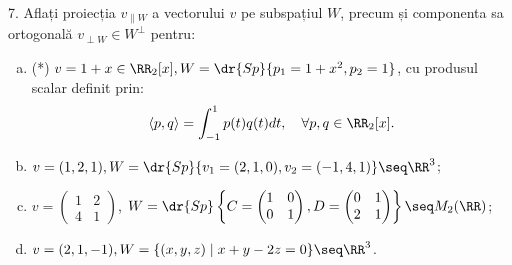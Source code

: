 7. Aflați proiecția $ v_{\parallel W} $ a vectorului $ v $ pe
subspațiul $ W $, precum și componenta sa ortogonală $ v_{\perp W} \in W^\perp $ pentru:
\begin{enumerate}[(a)]
\item (*) $ v = 1 + x \in \RR_2[x], W = \dr{Sp}\{ p_1 = 1 + x^2, p_2 = 1 \} $, cu
  produsul scalar definit prin:
  \[
    \langle p, q \rangle = \int_{-1}^1 p(t) q(t) dt, \quad \forall p, q \in \RR_2[x].
  \]
\item $ v = (1, 2, 1), W = \dr{Sp} \{ v_1 = (2, 1, 0), v_2 = (-1, 4, 1) \} \seq \RR^3 $;
\item $ v = \begin{pmatrix} 1 & 2 \\ 4 & 1 \end{pmatrix} $, $ W = \dr{Sp} %
    \left\{ C = \begin{pmatrix} 1 & 0 \\ 0 & 1 \end{pmatrix}, %
      D = \begin{pmatrix} 0 & 1 \\ 2 & 1 \end{pmatrix} \right\} \seq M_2(\RR) $;
\item $ v = (2, 1, -1), W = \{ (x, y, z) \mid x + y - 2z = 0 \} \seq \RR^3 $.
\end{enumerate}
